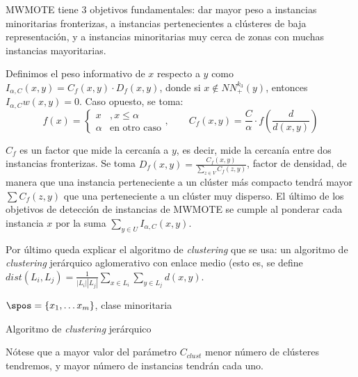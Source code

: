 MWMOTE tiene 3 objetivos fundamentales: dar mayor peso a instancias minoritarias fronterizas, a instancias pertenecientes
a clústeres de baja representación, y a instancias minoritarias muy cerca de zonas con muchas instancias mayoritarias.

Definimos el peso informativo de $x$ respecto a $y$ como $I_{\alpha,C}(x,y) = C_f(x,y) \cdot D_f(x,y)$, donde si 
$x \notin NN_{+}^{k_3}(y)$, entonces $I_{\alpha,C}w(x,y) = 0$. Caso opuesto, se toma:
\[
  f(x) = \left\{\begin{array}{ll} 
                x &, x\le \alpha \\
                \alpha & \textrm{en otro caso}
               \end{array}\right.,\qquad C_f(x,y) = \frac{C}{\alpha} \cdot f\left(\frac{d}{d(x,y)}\right)
\]

$C_f$ es un factor que mide la cercanía a $y$, es decir, mide la cercanía entre dos instancias fronterizas. Se toma 
$D_f(x,y) = \frac{C_f(x,y)}{\sum_{z\in V} C_f(z,y)}$, factor de densidad, de manera que una instancia perteneciente
a un clúster más compacto tendrá mayor $\sum C_f(z,y)$ que una perteneciente a un clúster muy disperso. El último de los
objetivos de detección de instancias de MWMOTE se cumple al ponderar cada instancia $x$ por la suma 
$\sum_{y\in U} I_{\alpha, C}(x,y)$.

Por último queda explicar el algoritmo de \textit{clustering} que se usa: un algoritmo de \textit{clustering} jerárquico
aglomerativo con enlace medio (esto es, se define $dist(L_i, L_j) = \frac{1}{|L_i||L_j|} \sum_{x\in L_i} \sum_{y\in L_j} d(x,y)$.


\begin{algorithm}[H]
\begin{algorithmic}[1]
  \REQUIRE $\spos = \{x_1, \ldots x_m\}$, clase minoritaria
  \ENDWHILE
\end{algorithmic}
\caption{Algoritmo de \textit{clustering} jerárquico}
\label{alg:hclust}
\end{algorithm}

Nótese que a mayor valor del parámetro $C_{clust}$ menor número de clústeres tendremos, y mayor número de instancias tendrán
cada uno.
